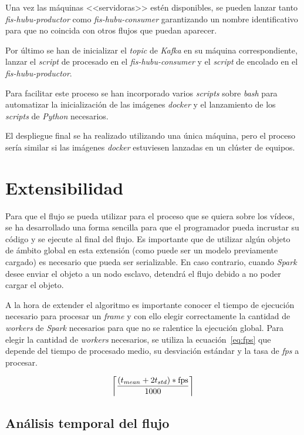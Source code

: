 Una vez las máquinas <<servidoras>> estén disponibles, se pueden lanzar tanto \textit{fis-hubu-productor} como \textit{fis-hubu-consumer} garantizando un nombre identificativo para que no coincida con otros flujos que puedan aparecer.

Por último se han de inicializar el \textit{topic} de \textit{Kafka} en su máquina correspondiente, lanzar el \textit{script} de procesado en el \textit{fis-hubu-consumer} y el \textit{script} de encolado en el \textit{fis-hubu-productor}.

Para facilitar este proceso se han incorporado varios \textit{scripts} sobre \textit{bash} para automatizar la inicialización de las imágenes \textit{docker} y el lanzamiento de los \textit{scripts} de \textit{Python} necesarios.

El despliegue final se ha realizado utilizando una única máquina, pero el proceso sería similar si las imágenes \textit{docker} estuviesen lanzadas en un clúster de equipos.
  

\section{Extensibilidad}

Para que el flujo se pueda utilizar para el proceso que se quiera sobre los vídeos, se ha desarrollado una forma sencilla para que el programador pueda incrustar su código y se ejecute al final del flujo. Es importante que de utilizar algún objeto de ámbito global en esta extensión (como puede ser un modelo previamente cargado) es necesario que pueda ser serializable. En caso contrario, cuando \textit{Spark} desee enviar el objeto a un nodo esclavo, detendrá el flujo debido a no poder cargar el objeto.

A la hora de extender el algoritmo es importante conocer el tiempo de ejecución necesario para procesar un \textit{frame} y con ello elegir correctamente la cantidad de \textit{workers} de \textit{Spark} necesarios para que no se ralentice la ejecución global. Para elegir la cantidad de \textit{workers} necesarios, se utiliza la ecuación~\ref{eq:fps} que depende del tiempo de procesado medio, su desviación estándar y la tasa de \textit{fps} a procesar.

\begin{equation}\label{eq:fps}
\left \lceil \frac{(t_{mean}+2t_{std})*\textrm{fps}}{1000} \right \rceil
\end{equation}

\subsection{Análisis temporal del flujo}\label{sec:analisistemporal_flujo}

